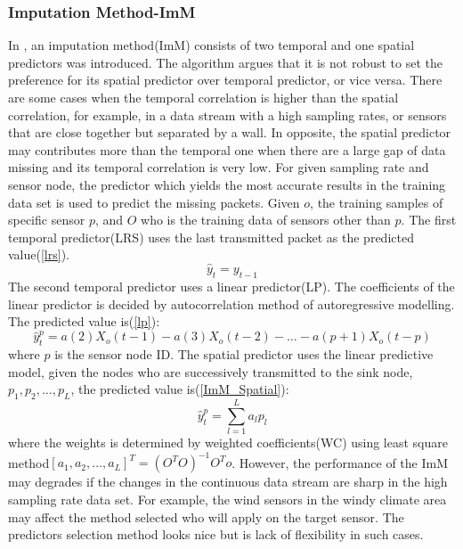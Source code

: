 \subsubsection{Imputation Method-ImM}
 In \cite{Lim:robust}, an imputation method(ImM) consists of two temporal and one spatial predictors was introduced. The algorithm argues that it is not robust to set the preference for its spatial predictor over temporal predictor, or vice versa. There are some cases when the temporal correlation is higher than the spatial correlation, for example, in a data stream with a high sampling rates, or sensors that are close together but separated by a wall. In opposite, the spatial predictor may contributes more than the temporal one when there are a large gap of data missing and its temporal correlation is very low. For given sampling rate and sensor node, the predictor which yields the most accurate results in the training data set is used to predict the missing packets. Given $o$, the training samples of specific sensor $p$, and $O$ who is the training data of sensors other than $p$.  The first temporal predictor(LRS) uses the last transmitted packet as the predicted value(\ref{lrs}).
\begin{equation}
\hat{y}_{t} =y_{t-1} \label{lrs}
\end{equation} 
 The second temporal predictor uses a linear predictor(LP). The coefficients of the linear predictor is decided by autocorrelation method of autoregressive modelling. The predicted value is(\ref{lp}):
\begin{equation}
\hat{y}_{t}^p = a(2)X_o(t-1) - a(3)X_o(t-2)- \dots -a(p+1)X_o(t-p) \label{lp}
\end{equation} 
where $p$ is the sensor node ID.  
The spatial predictor uses the linear predictive model, given the nodes who are successively transmitted to the sink node, $p_1,p_2,\dots,p_L$, the predicted value is(\ref{ImM_Spatial}): 
\begin{equation}
\hat{y}_{t}^p = \sum_{l=1}^L a_lp_l
\label{ImM_Spatial}
\end{equation}
 where the weights is determined by weighted coefficients(WC) using least square method$[a_1,a_2,\dots,a_L]^T = (O^TO)^{-1}O^To$.
  However, the performance of the ImM may degrades if the changes in the continuous data stream are sharp in the high sampling rate data set. For example, the wind sensors in the windy climate area may affect the method selected who will apply on the target sensor. The predictors selection method looks nice but is lack of flexibility in such cases.
  
